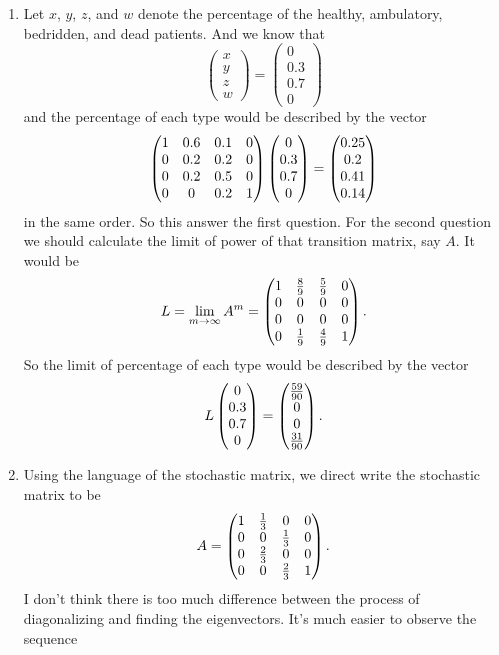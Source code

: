 \begin{enumerate}
\item Let $x$, $y$, $z$, and $w$ denote the percentage of the healthy, ambulatory, bedridden, and dead patients. And we know that 
\[\begin{pmatrix}x\\y\\z\\w\end{pmatrix}=\begin{pmatrix}0\\0.3\\0.7\\0\end{pmatrix}\]
and the percentage of each type would be described by the vector 
\[\begin{pmatrix}1 & 0.6 & 0.1 & 0\cr 0 & 0.2 & 0.2 & 0\cr 0 & 0.2 & 0.5 & 0\cr 0 & 0 & 0.2 & 1\end{pmatrix}\begin{pmatrix}0\\0.3\\0.7\\0\end{pmatrix}=\begin{pmatrix}0.25\cr 0.2\cr 0.41\cr 0.14\end{pmatrix}\]
in the same order. So this answer the first question. For the second question we should calculate the limit of power of that transition matrix, say $A$. It would be 
\[L=\lim_{m\rightarrow \infty}{A^m}=\begin{pmatrix}1 & \frac{8}{9} & \frac{5}{9} & 0\cr 0 & 0 & 0 & 0\cr 0 & 0 & 0 & 0\cr 0 & \frac{1}{9} & \frac{4}{9} & 1\end{pmatrix}.\]
So the limit of percentage of each type would be described by the vector
\[L\begin{pmatrix}0\\0.3\\0.7\\0\end{pmatrix}=\begin{pmatrix}\frac{59}{90}\cr 0\cr 0\cr \frac{31}{90}\end{pmatrix}.\]
\item Using the language of the stochastic matrix, we direct write the stochastic matrix to be 
\[A=\begin{pmatrix}1 & \frac{1}{3} & 0 & 0\cr 0 & 0 & \frac{1}{3} & 0\cr 0 & \frac{2}{3} & 0 & 0\cr 0 & 0 & \frac{2}{3} & 1\end{pmatrix}.\]
I don't think there is too much difference between the process of diagonalizing and finding the eigenvectors. It's much easier to observe the sequence 

\end{enumerate}
